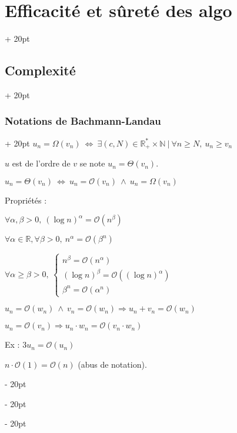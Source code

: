 \documentclass[a4paper, 12pt, twoside]{article}
\newcommand{\N}{\mathbb{N}} %
\newcommand{\R}{\mathbb{R}} %
\newcommand{\ssi}{\ \Leftrightarrow \ }
\newcommand{\ind}[1][20pt]{\advance\leftskip + #1}
\newcommand{\deind}[1][20pt]{\advance\leftskip - #1}
\newenvironment{indentedenv}[1][20pt]{\par \ind[#1]}{\par \deind}
\newenvironment{indt}[2][20pt]{#2 \begin{indentedenv}[#1]}{\end{indentedenv}} %
\begin{document}
\begin{indt}{\section{Efficacité et sûreté des algo}}
\begin{indt}{\subsection{Complexité}}
\begin{indt}{\subsubsection{Notations de Bachmann-Landau}}
                $u_n = \Omega(v_n) \ssi \exists (c, N) \in \R^*_+ \times \N \ |\ \forall n \ge N,\ u_n \ge v_n$
                
                \vspace{6pt}
                
                $u$ est de l'ordre de $v$ se note $u_n = \Theta(v_n)$.
                
                $u_n = \Theta(v_n) \ssi u_n = \mathcal{O}(v_n) \ \wedge\ u_n = \Omega(v_n)$
                
                \vspace{12pt}
                
                Propriétés :
                
                $\forall \alpha, \beta > 0,\ (\log n)^\alpha = \mathcal{O}(n^\beta)$
                
                $\forall \alpha \in \R, \forall \beta > 0,\ n^\alpha = \mathcal{O}(\beta^n)$
                
                $
                    \forall \alpha \ge \beta > 0,\
                    \begin{cases}
                        n^\beta = \mathcal{O}(n^\alpha)
                        \\
                        (\log n)^\beta = \mathcal{O}((\log n)^\alpha)
                        \\
                        \beta^n = \mathcal{O}(\alpha^n)
                    \end{cases}
                $
                
                $u_n = \mathcal{O}(w_n)\ \wedge\ v_n = \mathcal{O}(w_n) \Rightarrow u_n + v_n = \mathcal{O}(w_n)$
                
                $u_n = \mathcal{O}(v_n) \Rightarrow u_n \cdot w_n = \mathcal{O}(v_n \cdot w_n)$
                
                \vspace{6pt}
                
                Ex :
                $3u_n = \mathcal{O}(u_n)$
                
                $n \cdot \mathcal{O}(1) = \mathcal{O}(n)$ (abus de notation).
                
            \end{indt}
            
            \vspace{12pt}
            

\end{indt}
\end{indt}
\end{document}
